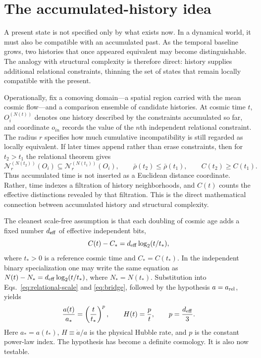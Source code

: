 \documentclass[10pt]{article}
\begin{document}
\section*{The accumulated-history idea}

A present state is not specified only by what exists now.  In a dynamical
world, it must also be compatible with an accumulated past.  As the temporal
baseline grows, two histories that once appeared equivalent may become
distinguishable.  The analogy with structural complexity is therefore direct:
history supplies additional relational constraints, thinning the set of states
that remain locally compatible with the present.

Operationally, fix a comoving domain---a spatial region carried with the mean
cosmic flow---and a comparison ensemble of candidate histories.  At cosmic
time $t$, $O_i^{(N(t))}$ denotes one history described by
the constraints accumulated so far, and coordinate $o_{in}$ records the value
of the $n$th independent relational constraint.  The radius $r$ specifies how
much cumulative incompatibility is still regarded as locally equivalent.  If
later times append rather than erase constraints, then for $t_2>t_1$ the
relational theorem gives
\begin{equation}
\mathcal N_r^{(N(t_2))}(O_i)
\subseteq\mathcal N_r^{(N(t_1))}(O_i),
\qquad
\bar\rho(t_2)\leq\bar\rho(t_1),
\qquad
C(t_2)\geq C(t_1).
\label{eq:history-filtration}
\end{equation}
Thus accumulated time is not inserted as a Euclidean distance coordinate.
Rather, time indexes a filtration of history neighborhoods, and $C(t)$ counts
the effective distinctions revealed by that filtration.  This is the direct
mathematical connection between accumulated history and structural
complexity.

The cleanest scale-free assumption is that each doubling of cosmic age adds a
fixed number $d_{\rm eff}$ of effective independent bits,
\begin{equation}
C(t)-C_*=d_{\rm eff}\log_2(t/t_*),
\label{eq:history}
\end{equation}
where $t_*>0$ is a reference cosmic time and $C_*=C(t_*)$.  In the independent
binary specialization one may write the same equation as
$N(t)-N_*=d_{\rm eff}\log_2(t/t_*)$, where $N_*=N(t_*)$.  Substitution into
Eqs.~\eqref{eq:relational-scale} and \eqref{eq:bridge}, followed by the
hypothesis $a=a_{\rm rel}$, yields
\begin{equation}
\frac{a(t)}{a_*}=\left(\frac{t}{t_*}\right)^p,\qquad
H(t)=\frac{p}{t},\qquad
p=\frac{d_{\rm eff}}{3}.
\label{eq:power}
\end{equation}
Here $a_*=a(t_*)$, $H\equiv\dot a/a$ is the physical Hubble rate, and $p$ is
the constant power-law index.  The hypothesis has become a definite
cosmology.  It is also now testable.
\end{document}
